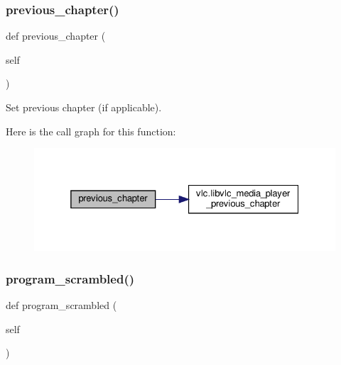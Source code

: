 \subsubsection{\texorpdfstring{previous\+\_\+chapter()}{previous\_chapter()}}
{\footnotesize\ttfamily def previous\+\_\+chapter (\begin{DoxyParamCaption}\item[{}]{self }\end{DoxyParamCaption})}

\begin{DoxyVerb}Set previous chapter (if applicable).
\end{DoxyVerb}
 Here is the call graph for this function\+:
\nopagebreak
\begin{figure}[H]
\begin{center}
\leavevmode
\includegraphics[width=325pt]{classvlc_1_1_media_player_aeab748e2d6ccb4b1fe101585b682a359_cgraph}
\end{center}
\end{figure}
\mbox{\label{classvlc_1_1_media_player_ab21e3e8564c32ce300d90fac7fb18a99}} 
\subsubsection{\texorpdfstring{program\+\_\+scrambled()}{program\_scrambled()}}
{\footnotesize\ttfamily def program\+\_\+scrambled (\begin{DoxyParamCaption}\item[{}]{self }\end{DoxyParamCaption})}

